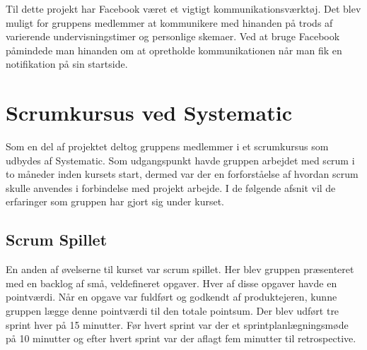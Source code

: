 Til dette projekt har Facebook været et vigtigt kommunikationsværktøj. Det blev muligt for gruppens medlemmer at kommunikere med hinanden på trods af varierende undervisningstimer og personlige skemaer. Ved at bruge Facebook påmindede man hinanden om at opretholde kommunikationen når man fik en notifikation på sin startside.

\chapter{Scrumkursus ved Systematic}
Som en del af projektet deltog gruppens medlemmer i et scrumkursus som udbydes af Systematic. Som udgangspunkt havde gruppen arbejdet med scrum i to måneder inden kursets start, dermed var der en forforståelse af hvordan scrum skulle anvendes i forbindelse med projekt arbejde. I de følgende afsnit vil de erfaringer som gruppen har gjort sig under kurset.


\section{Scrum Spillet}
En anden af øvelserne til kurset var scrum spillet. Her blev gruppen præsenteret med en backlog af små, veldefineret opgaver. Hver af disse opgaver havde en pointværdi. Når en opgave var fuldført og godkendt af produktejeren, kunne gruppen lægge denne pointværdi til den totale pointsum. Der blev udført tre sprint hver på 15 minutter. Før hvert sprint var der et sprintplanlægningsmøde på 10 minutter og efter hvert sprint var der aflagt fem minutter til retrospective. \newline

